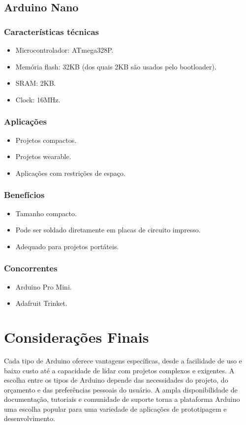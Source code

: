 \documentclass{estacio}
\begin{document}
\subsection{Arduino Nano}
\subsubsection{Características técnicas}
\begin{itemize}
    \item Microcontrolador: ATmega328P.
    \item Memória flash: 32KB (dos quais 2KB são usados pelo bootloader).
    \item SRAM: 2KB.
    \item Clock: 16MHz.
\end{itemize}
\subsubsection{Aplicações}
\begin{itemize}
    \item Projetos compactos.
    \item Projetos wearable.
    \item Aplicações com restrições de espaço.
\end{itemize}
\subsubsection{Benefícios}
\begin{itemize}
    \item Tamanho compacto.
    \item Pode ser soldado diretamente em placas de circuito impresso.
    \item Adequado para projetos portáteis.
\end{itemize}
\subsubsection{Concorrentes}
\begin{itemize}
    \item Arduino Pro Mini.
    \item Adafruit Trinket.
\end{itemize}

\section{Considerações Finais}
Cada tipo de Arduino oferece vantagens específicas, desde a facilidade de uso e baixo custo até a capacidade de lidar com projetos complexos e exigentes. A escolha entre os tipos de Arduino depende das necessidades do projeto, do orçamento e das preferências pessoais do usuário. A ampla disponibilidade de documentação, tutoriais e comunidade de suporte torna a plataforma Arduino uma escolha popular para uma variedade de aplicações de prototipagem e desenvolvimento.
\end{document}
